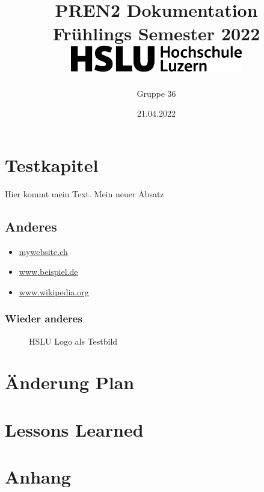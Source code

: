 \documentclass[a4paper]{article}
\title{
    {PREN2 Dokumentation} \\
    \vspace{10mm}
    { Frühlings Semester 2022 } \\
    \vspace{10mm}
    {\includegraphics[width=75mm]{img/hsluLogo2022.png}}
}
\author{Gruppe 36}
\date{21.04.2022}
\begin{document}
\maketitle

\newpage

\tableofcontents

\newpage

\section{Testkapitel}

Hier kommt mein Text.
\newline
Mein neuer Absatz

\subsection{Anderes}

\begin{itemize}
    \item \url{mywebsite.ch}
    \item \url{www.beispiel.de}
    \item \url{www.wikipedia.org}
\end{itemize}

\subsubsection{Wieder anderes}

\begin{figure}[!htb]\centering
    \begin {minipage}{0.6\textwidth}
        \caption{HSLU Logo als Testbild}\label{Fig:Data3}
    \end{minipage}
\end{figure}

\section{Änderung Plan}

\section{Lessons Learned}

\section{Anhang}
\end{document}
